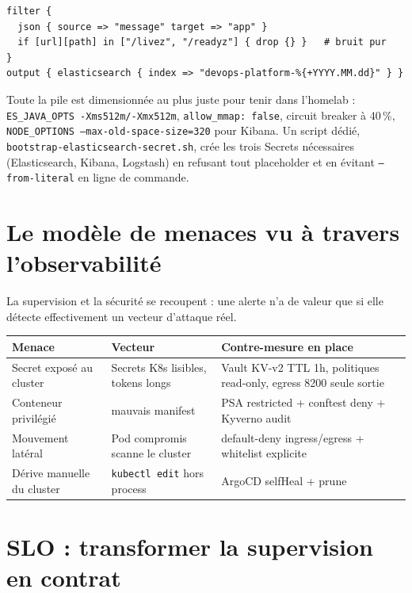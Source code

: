 \documentclass[12pt,a4paper,twoside,openright]{report}
\begin{document}
\begin{lstlisting}[caption={Pipeline Logstash : filtrage et enrichissement}]
filter {
  json { source => "message" target => "app" }
  if [url][path] in ["/livez", "/readyz"] { drop {} }   # bruit pur
}
output { elasticsearch { index => "devops-platform-%{+YYYY.MM.dd}" } }
\end{lstlisting}

Toute la pile est dimensionnée au plus juste pour tenir dans l'homelab :
\texttt{ES\_JAVA\_OPTS -Xms512m/-Xmx512m}, \texttt{allow\_mmap: false}, circuit
breaker à 40\,\%, \texttt{NODE\_OPTIONS --max-old-space-size=320} pour Kibana. Un
script dédié, \texttt{bootstrap-elasticsearch-secret.sh}, crée les trois Secrets
nécessaires (Elasticsearch, Kibana, Logstash) en refusant tout placeholder et en
évitant \texttt{--from-literal} en ligne de commande.

\section{Le modèle de menaces vu à travers l'observabilité}

La supervision et la sécurité se recoupent : une alerte n'a de valeur que si elle
détecte effectivement un vecteur d'attaque réel.

\begin{center}\end{center}
\begin{longtable}{@{}p{3.6cm}p{5.6cm}p{5.0cm}@{}}
\toprule
\textbf{Menace} & \textbf{Vecteur} & \textbf{Contre-mesure en place} \\
\midrule
\endhead
Secret exposé au cluster & Secrets K8s lisibles, tokens longs & Vault KV-v2 TTL 1h, politiques read-only, egress 8200 seule sortie \\
Conteneur privilégié & mauvais manifest & PSA restricted + conftest deny + Kyverno audit \\
Mouvement latéral & Pod compromis scanne le cluster & default-deny ingress/egress + whitelist explicite \\
Dérive manuelle du cluster & \texttt{kubectl edit} hors process & ArgoCD selfHeal + prune \\
\bottomrule
\end{longtable}

\section{SLO : transformer la supervision en contrat}
\end{document}
